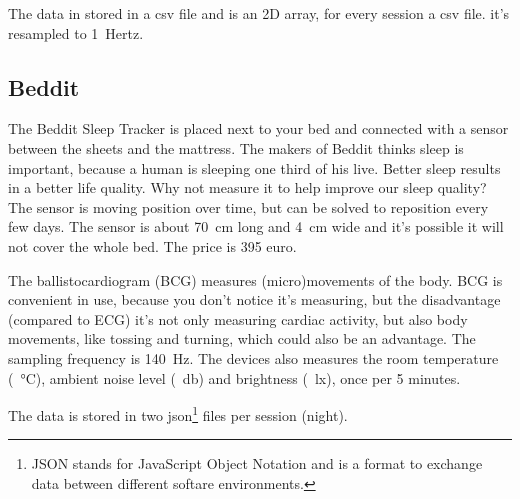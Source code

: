 

			The data in stored in a csv file and is an 2D array, for every session a csv file. it's resampled to \SI{1}{Hertz}.
	\subsection{Beddit}
		The Beddit Sleep Tracker is placed next to your bed and connected with a sensor between the sheets and the mattress. The makers of Beddit thinks sleep is important, because a human is sleeping one third of his live. Better sleep results in a better life quality. Why not measure it to help improve our sleep quality? The sensor is moving position over time, but can be solved to reposition every few days. The sensor is about \SI{70}{\centi\metre} long and \SI{4}{\centi\metre} wide and it's possible it will not cover the whole bed. 
			The price is 395 euro.

			The ballistocardiogram (BCG) measures (micro)movements of the body.\cite{beddit}
			BCG is convenient in use, because you don't notice it's measuring, but the disadvantage (compared to ECG) it's not only measuring cardiac activity, but also body movements, like tossing and turning, which could also be an advantage.\cite{bcg} The sampling frequency is \SI{140}{\hertz}. The devices also measures the room temperature (\SI{}{\celsius}), ambient noise level (\SI{}{\decibel}) and brightness (\SI{}{\lux}), once per 5 minutes.\cite{bedditapi}

			The data is stored in two json\footnote{JSON stands for JavaScript Object Notation and is a format to exchange data between different softare environments.\cite{json}} files per session (night).







